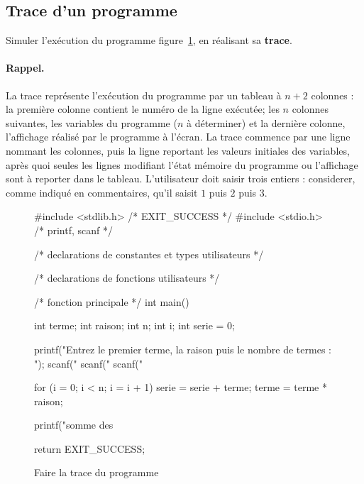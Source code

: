 \subsection{Trace d'un programme} 

\question Simuler l'exécution du programme figure~\ref{pourtrace}, en réalisant sa
\textbf{trace}.

\paragraph{Rappel.} La trace représente l'exécution du programme par
un tableau à $n + 2$ colonnes : la première colonne contient le numéro
de la ligne exécutée; les $n$ colonnes suivantes, les variables du
programme ($n$ à déterminer) et la dernière colonne, l'affichage
réalisé par le programme à l'écran. La trace commence par une ligne
nommant les colonnes, puis la ligne reportant les valeurs initiales
des variables, après quoi seules les lignes modifiant l'état mémoire
du programme ou l'affichage sont à reporter dans le
tableau. L'utilisateur doit saisir trois entiers : considerer, comme
indiqué en commentaires, qu'il saisit $1$ puis $2$ puis $3$.
\begin{figure}[htbp]
\begin{small}
\begin{listing}{1}
#include <stdlib.h> /* EXIT_SUCCESS */
#include <stdio.h> /* printf, scanf */

/* declarations de constantes et types utilisateurs */

/* declarations de fonctions utilisateurs */

/* fonction principale */
int main()
{
    int terme;
    int raison;
    int n;
    int i;
    int serie = 0;
    
    printf("Entrez le premier terme, la raison puis le nombre de termes : ");
    scanf("%
    scanf("%
    scanf("%
    
    for (i = 0; i < n; i = i + 1)
    {
        serie = serie + terme;
        terme = terme * raison;
    }

    printf("somme des %

    return EXIT_SUCCESS;
}
\end{listing}
\end{small}
  \caption{Faire la trace du programme}
  \label{pourtrace}
\end{figure}

